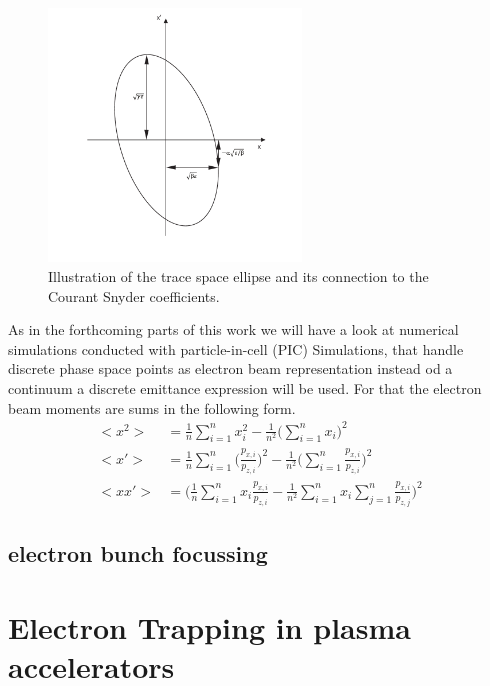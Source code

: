 \begin{figure}[htbp]
\begin{center}
\includegraphics[width=0.6\textwidth]{theory/images/edited/TraceSpaceCourantSnyder.pdf}
\end{center}
\caption{Illustration of the trace space ellipse and its connection to the Courant Snyder coefficients.}
\label{img:TraceSpace}
\end{figure}
As in the forthcoming parts of this work we will have a look at numerical simulations conducted with particle-in-cell (PIC) Simulations, that handle discrete phase space points as electron beam representation instead od a continuum a discrete emittance expression will be used. For that the electron beam moments are sums in the following form.
\begin{align}
<x^2>&=\frac{1}{n} \sum_{i=1}^{n} x_i^2-\frac{1}{n^2}\Big(\sum_{i=1}^{n} x_i\Big)^2\\
<x'>&=\frac{1}{n} \sum_{i=1}^{n}\Big(\frac{p_{x,i}}{p_{z,i}}\Big)^2-\frac{1}{n^2}\Big(\sum_{i=1}^{n}\frac{p_{x,i}}{p_{z,i}}\Big)^2\\
<xx'>&=\Big(\frac{1}{n}\sum_{i=1}^{n}x_i\frac{p_{x,i}}{p_{z,i}}-\frac{1}{n^2}\sum_{i=1}^{n}x_i \sum_{j=1}^{n}\frac{p_{x,i}}{p_{z,j}}\Big)^2
\end{align}
\subsection{electron bunch focussing}


\section{Electron Trapping in plasma accelerators}
\label{sec:Theory_Trapping}


